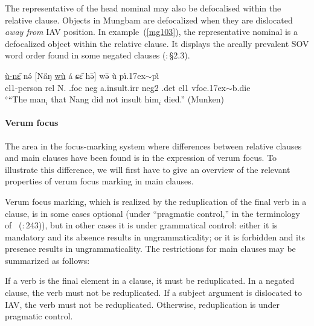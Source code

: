 \documentclass[10pt,twoside]{article}
\makeatletter
\newcommand{\cl}[1]{{\sc cl#1}}
\newcommand{\citepage}[2]{\citeauthor{#1}~{(\citeyear{#1}:\,{#2})}}
\newcommand{\citepp}[2]{(\citealp{#1}:\,{#2})}
\def\elicited{$^\diamond$}
\def\til{\raise.17ex\hbox{$\scriptstyle\mathtt{\sim}$}}	%
\renewcommand{\i}{ı}
\def\@{ə}
\def\eh{ɛ}
\def\ng{ŋ}
\def\sh{ɕ}
\makeatother
\begin{document}
The representative of the head nominal may also be defocalised within
the relative clause. Objects in Mungbam are defocalized when they
are dislocated {\it away from}\/ IAV position. 
In example~(\ref{mg103}), the representative nominal is a defocalized
object within the relative clause. It
displays the areally prevalent SOV word order found in some negated clauses
\citepp{gueldemann:2007}{\S2.3}.
%
\begin{exe}
\ex \label{mg103}
	\gll \uline{\`u-n\={\eh}} n\'{\@} $[$N\H{a}{\ng} \uline{w\`u} \'a \sh\={\eh} h\={\@}$]$ w\={\@} \`u p\'\i{\til}p\H{\i}	\\
\cl1-person {\sc rel} N. {\sc \cl1.foc} {\sc neg} a.insult.{\sc irr} {\sc neg2} {\sc \cl1.det} \cl1 {\sc vfoc}\til{b.die}	\\
\glt \elicited``The man$_i$ that Nang did not insult him$_i$ died.'' (Munken)	%
\end{exe}
%

\paragraph{Verum focus}
The area in the focus-marking system where differences
between relative clauses and main clauses have been found
is in the expression of verum focus. To illustrate this
difference, we will first have to give an overview of the relevant
properties of verum focus marking in main clauses.

Verum focus marking, which is realized by the reduplication of the
final verb in a clause, is in some cases optional (under
``pragmatic control,'' in the terminology of \citepage{hyman:1984}{243}),
but in other cases it is under grammatical control: either it is mandatory 
and its absence results in ungrammaticality; or it is forbidden
and its presence results in ungrammaticality.
The restrictions for main clauses may be summarized as follows: 
%
\begin{exe}
\ex \label{mg1044}
\begin{xlist}
\ex \label{mg1044a}
If a verb is the final element in a clause, it must be reduplicated.
\ex 
In a negated clause, the verb must not be reduplicated.
\ex \label{mg1044b}
If a subject argument is dislocated to IAV, the verb must not be reduplicated.
\ex Otherwise, reduplication is under pragmatic control.
\end{xlist}
\end{exe}
%
\end{document}
